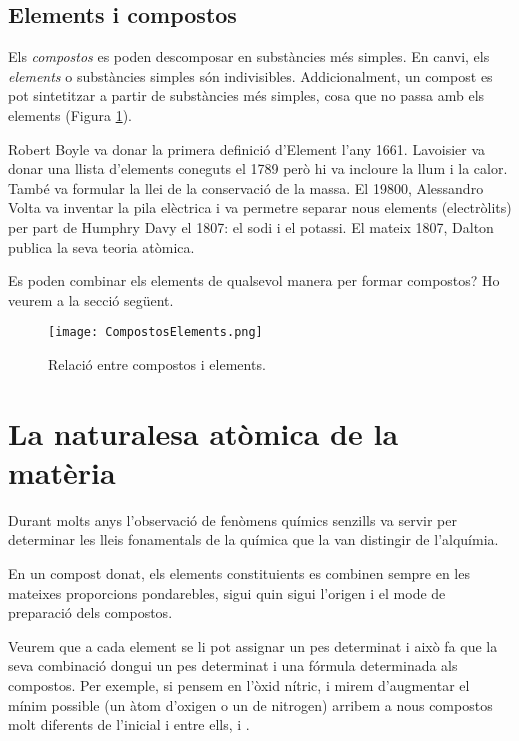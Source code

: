 \subsection{Elements i compostos}

Els \emph{compostos} es poden descomposar en substàncies més simples. En canvi, els \emph{elements} o substàncies simples són indivisibles. Addicionalment, un compost es pot sintetitzar a partir de substàncies més simples, cosa que no passa amb els elements (Figura \ref{fig:CompostosElements}). 

Robert Boyle va donar la primera definició d'Element l'any 1661. Lavoisier va donar una llista d'elements coneguts el 1789 però hi va incloure la llum i la calor. També va formular la llei de la conservació de la massa. El 19800, Alessandro Volta va inventar la pila elèctrica i va permetre separar nous elements (electròlits) per part de Humphry Davy el 1807: el sodi i el potassi. El mateix 1807, Dalton publica la seva teoria atòmica.

Es poden combinar els elements de qualsevol manera per formar compostos? Ho veurem a la secció següent.

\begin{figure}[h]
\centering
\texttt{[image: CompostosElements.png]}
\caption{Relació entre compostos i elements.}
\label{fig:CompostosElements}
\end{figure}


\section{La naturalesa atòmica de la matèria}

Durant molts anys l'observació de fenòmens químics senzills va servir per determinar les lleis fonamentals de la química que la van distingir de l'alquímia.

\begin{mdframed}[backgroundcolor=gray!30,frametitle=Llei de les proporcions definides]
En un compost donat, els elements constituients es combinen sempre en les mateixes proporcions pondarebles, sigui quin sigui l'origen i el mode de preparació dels compostos.
\end{mdframed}

Veurem que a cada element se li pot assignar un pes determinat i això fa que la seva combinació dongui un pes determinat i una fórmula determinada als compostos.
Per exemple, si pensem en l'òxid nítric,  i mirem d'augmentar el mínim possible (un àtom d'oxigen o un de nitrogen) arribem a nous compostos molt diferents de l'inicial i entre ells,  i . 

